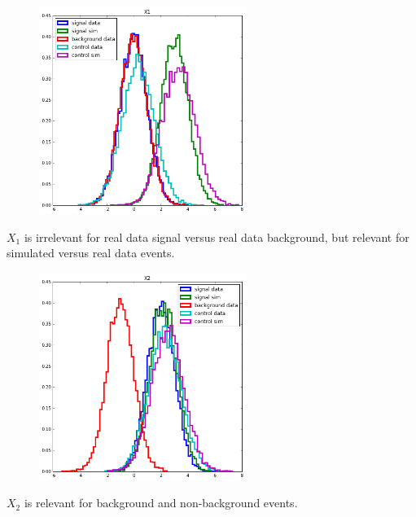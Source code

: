 \documentclass{beamer}
\begin{document}
\begin{frame}

\begin{figure}
\centering
\includegraphics[width=0.6\textwidth]{x1.png}
\end{figure}

$X_1$ is {\color{red} irrelevant} for real data signal versus real data
background, but relevant for simulated versus real data events.

\end{frame}

\begin{frame}

\begin{figure}
\centering
\includegraphics[width=0.6\textwidth]{x2.png}
\end{figure}

$X_2$ is {\color{blue} relevant} for  background and non-background events.

\end{frame}
\end{document}

